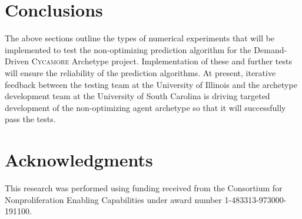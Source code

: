 \documentclass{anstrans}
\newcommand{\Cycamore}{\textsc{Cycamore}\xspace}%
\begin{document}
\section{Conclusions}
The above sections outline the types of numerical experiments that will be 
implemented to test the non-optimizing prediction algorithm for the 
Demand-Driven \Cycamore Archetype project. Implementation of these and further 
tests will ensure the reliability of the prediction algorithms.  
At present, iterative feedback between the testing team at the University of 
Illinois and the archetype development team at the University of South Carolina 
is driving targeted development of the non-optimizing agent archetype so that 
it will successfully pass the tests. 

\section{Acknowledgments}
This research was performed using funding received from the Consortium for Nonproliferation Enabling Capabilities under award number 1-483313-973000-191100.



\end{document}
